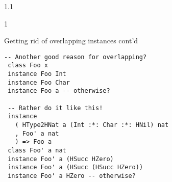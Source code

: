 \documentclass{slides}
\newenvironment{myslide}{\begin{slide}\color{Blue}\begin{boxedminipage}{1.1\hsize}\begin{boxedminipage}{1\hsize}\color{Black}
\vspace{-170\in}
}{%
\smallskip
\end{boxedminipage}
\end{boxedminipage}
\end{slide}}
\newenvironment{myslide}{\begin{slide}
}{%
\end{slide}}
\newenvironment{myslide}{\begin{slide}\color{White}\begin{boxedminipage}{1.1\hsize}\color{Black}
\vspace{-170\in}
}{%
\smallskip
\end{boxedminipage}
\end{slide}}
\newcommand{\header}[1]{{\large \color{Red} #1}}
\begin{document}
\begin{myslide}

\header{Getting rid of overlapping instances cont'd}

\medskip

\begin{Verbatim}[fontseries=normal,fontsize=\small,commandchars=\\\{\}]
 -- Another good reason for overlapping?
 class Foo x
 instance Foo Int
 instance Foo Char
 instance Foo a -- otherwise?

 -- Rather do it like this!
 instance 
   ( HType2HNat a (Int :*: Char :*: HNil) nat
   , Foo' a nat
   ) => Foo a
 class Foo' a nat
 instance Foo' a (HSucc HZero)
 instance Foo' a (HSucc (HSucc HZero))
 instance Foo' a HZero -- otherwise?
\end{Verbatim}


\end{myslide}



\end{document}
